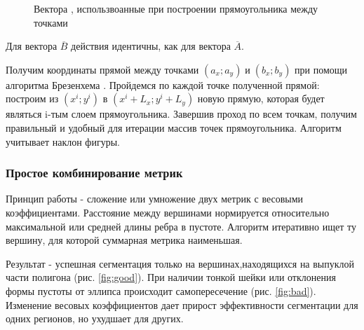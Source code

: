 \documentclass[a4paper, 14pt]{article}
\begin{document}
\begin{figure}[h]
	\caption{Вектора , использвоанные при построении прямоугольника между точками}
	\label{fig:lines}
\end{figure}

Для вектора $\overline{B}$ действия идентичны, как для вектора $\overline{A}$. 

Получим координаты прямой между точками $(a_x;a_y)\;и \;(b_x;b_y)$ при помощи алгоритма Брезенхема \cite{line}.
Пройдемся по каждой точке полученной прямой: построим  из $(x^i;y^i)$ в $(x^i+L_x;y^i+L_y)$ новую прямую, которая будет
являться i-тым слоем прямоугольника. Завершив проход по всем точкам, получим правильный и удобный для итерации массив точек прямоугольника. Алгоритм учитывает наклон фигуры.     


\subsubsection{Простое комбинирование метрик}
\label{sec:combine} 
Принцип работы - сложение или умножение двух метрик с весовыми коэффициентами.
 Расстояние между вершинами нормируется относительно максимальной или средней длины ребра в пустоте. 
Алгоритм итеративно ищет ту вершину, для которой суммарная метрика наименьшая. 

Результат - успешная сегментация только на вершинах,находящихся на выпуклой части полигона (рис. \ref{fig:good}). 
При наличии тонкой шейки или отклонения формы пустоты от эллипса происходит самопересечение (рис. \ref{fig:bad}). Изменение весовых коэффициентов дает прирост эффективности
сегментации для одних регионов, но ухудшает для других. 
\end{document}

